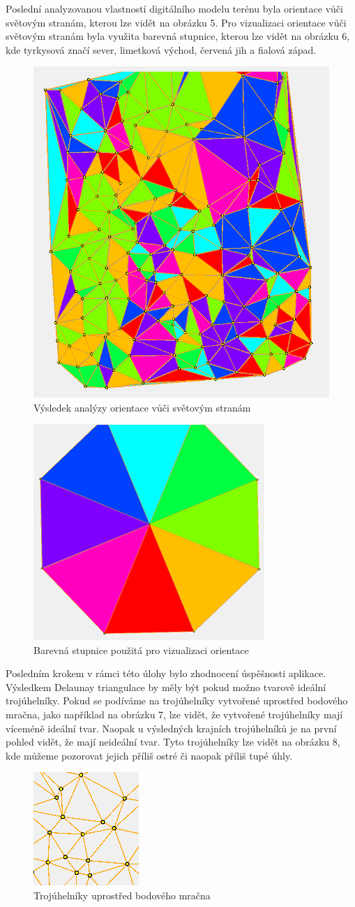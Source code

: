 \documentclass{article}
\begin{document}
\begin{spacing}{1.5}
Poslední analyzovanou vlastností digitálního modelu terénu byla orientace vůči světovým stranám, kterou lze vidět na obrázku 5. Pro vizualizaci orientace vůči světovým stranám byla využita barevná stupnice, kterou lze vidět na obrázku 6, kde tyrkysová značí sever, limetková východ, červená jih a fialová západ.

\begin{figure}[htbp]
    \centering
    \includegraphics[width=0.4\linewidth]{images/05orientace.png}
    \caption{Výsledek analýzy orientace vůči světovým stranám}
    \label{fig:enter-label}
\end{figure}

\begin{figure}[htbp]
    \centering
    \includegraphics[width=0.3\linewidth]{images/06barvy.png}
    \caption{Barevná stupnice použitá pro vizualizaci orientace}
    \label{fig:enter-label}
\end{figure}

\newpage
Posledním krokem v rámci této úlohy bylo zhodnocení úspěšnosti aplikace. Výsledkem Delaunay triangulace by měly být pokud možno tvarově ideální trojúhelníky. Pokud se podíváme na trojúhelníky vytvořené uprostřed bodového mračna, jako například na obrázku 7, lze vidět, že vytvořené trojúhelníky mají víceméně ideální tvar. Naopak u výsledných krajních trojúhelníků je na první pohled vidět, že mají neideální tvar. Tyto trojúhelníky lze vidět na obrázku 8, kde můžeme pozorovat jejich příliš ostré či naopak příliš tupé úhly.

\begin{figure}[htbp]
    \centering
    \includegraphics[width=0.2\linewidth]{images/07trojuhelnik.png}
    \caption{Trojúhelníky uprostřed bodového mračna}
    \label{fig:enter-label}
\end{figure}


\end{spacing}
\end{document}
